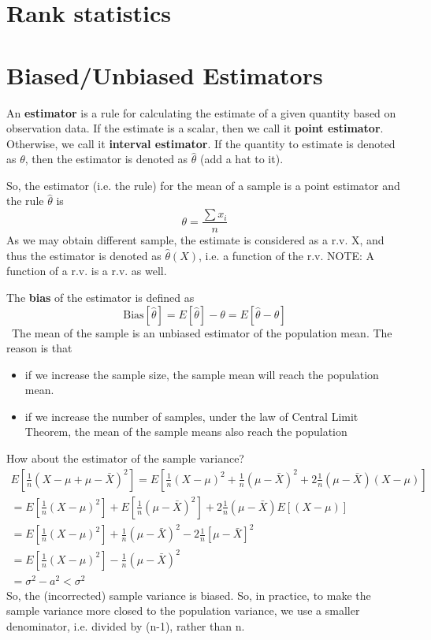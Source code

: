 \section{Rank statistics}
\label{sec:rank-statistics}


\section{Biased/Unbiased Estimators}
\label{sec:bias-estim}

An {\bf estimator} is a rule for calculating the estimate of a given
quantity based on observation data. If the estimate is a scalar, then
we call it {\bf point estimator}. Otherwise, we call it
{\bf interval estimator}. If the quantity to estimate is denoted as
$\theta$, then the estimator is denoted as $\hat\theta$ (add a hat to it).


So, the  estimator (i.e. the rule) for the mean of a sample is a point
estimator and the rule $\hat\theta$ is
\begin{equation}
  \label{eq:23}
  \theta = \frac{\sum x_i} {n}
\end{equation}
As we may obtain different sample, the estimate is considered as a
r.v. X, and thus the estimator is denoted as $\hat\theta(X)$, i.e. a
function of the r.v. NOTE: A function of a r.v. is a r.v. as well. 


The {\bf bias} of the estimator is defined as
\begin{equation}
  \label{eq:24}
  \text{Bias}[\hat\theta] = E[\hat\theta]-\theta = E[\hat\theta-\theta]
\end{equation}\
The mean of the sample is an unbiased estimator of the population
mean. The reason is that 
\begin{itemize}
\item if we increase the sample size, the sample
  mean will reach the population mean. 

\item if we increase the number of samples, under the law of Central
  Limit Theorem, the mean of the sample means also reach the
  population 
\end{itemize}

How about the estimator of the sample variance? 
\begin{equation}
  \label{eq:25}
  \begin{split}
    E[\frac{1}{n}(X-\mu+\mu-\bar{X})^2]=
    E[\frac{1}{n}(X-\mu)^2+\frac{1}{n}(\mu-\bar{X})^2+2\frac{1}{n}(\mu-\bar{X})(X-\mu)]
    \\
    =
    E[\frac{1}{n}(X-\mu)^2]+E[\frac{1}{n}(\mu-\bar{X})^2]+2\frac{1}{n}(\mu-\bar{X})E[(X-\mu)] 
\\
=E[\frac{1}{n}(X-\mu)^2]+\frac{1}{n}(\mu-\bar{X})^2-2\frac{1}{n}[\mu-\bar{X}]^2
\\
= E[\frac{1}{n}(X-\mu)^2] - \frac{1}{n}(\mu-\bar{X})^2 \\
= \sigma^2 - a^2 < \sigma^2
  \end{split}
\end{equation}
So, the (incorrected) sample variance is biased. So, in practice, to
make the sample variance more closed to the population variance, we
use a smaller denominator, i.e. divided by (n-1), rather than n. 


